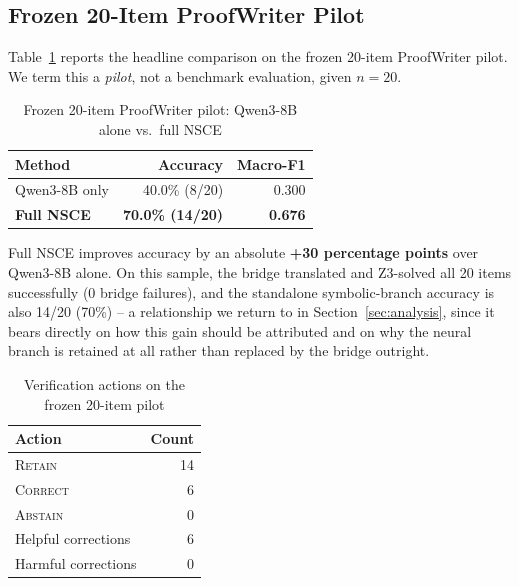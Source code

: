 \documentclass[conference]{IEEEtran}
\begin{document}
\subsection{Frozen 20-Item ProofWriter Pilot}
\label{sec:headline}
Table~\ref{tab:headline} reports the headline comparison on the frozen 20-item ProofWriter pilot. We term this a \emph{pilot}, not a benchmark evaluation, given $n=20$.

\begin{table}[t]
\caption{Frozen 20-item ProofWriter pilot: Qwen3-8B alone vs.\ full NSCE}
\label{tab:headline}
\centering
\begin{tabular}{@{}lrr@{}}
\toprule
Method & Accuracy & Macro-F1 \\
\midrule
Qwen3-8B only & 40.0\% (8/20) & 0.300 \\
\textbf{Full NSCE} & \textbf{70.0\% (14/20)} & \textbf{0.676} \\
\bottomrule
\end{tabular}
\end{table}

Full NSCE improves accuracy by an absolute \textbf{+30 percentage points} over Qwen3-8B alone. On this sample, the bridge translated and Z3-solved all 20 items successfully (0 bridge failures), and the standalone symbolic-branch accuracy is also 14/20 (70\%) -- a relationship we return to in Section~\ref{sec:analysis}, since it bears directly on how this gain should be attributed and on why the neural branch is retained at all rather than replaced by the bridge outright.

\begin{table}[t]
\caption{Verification actions on the frozen 20-item pilot}
\label{tab:verifier-actions}
\centering
\begin{tabular}{@{}lr@{}}
\toprule
Action & Count \\
\midrule
\textsc{Retain} & 14 \\
\textsc{Correct} & 6 \\
\textsc{Abstain} & 0 \\
\midrule
Helpful corrections & 6 \\
Harmful corrections & 0 \\
\bottomrule
\end{tabular}
\end{table}
\end{document}
